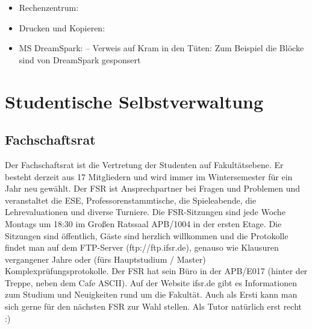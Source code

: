 \documentclass[a4paper,12pt]{report}
\begin{document}
\begin{itemize}
\begin{itemize*}
	\end{itemize*}
	\item Rechenzentrum:
	\item Drucken und Kopieren: 
	\item MS DreamSpark: -- Verweis auf Kram in den Tüten: Zum Beispiel die Blöcke sind von DreamSpark gesponsert
\end{itemize}

\section{Studentische Selbstverwaltung}
\subsection{Fachschaftsrat}
Der Fachschaftsrat ist die Vertretung der Studenten auf Fakultätsebene.
Er besteht derzeit aus 17 Mitgliedern und wird immer im Wintersemester für ein Jahr neu gewählt.
Der FSR ist Ansprechpartner bei Fragen und Problemen und veranstaltet die ESE, Professorenstammtische, die Spieleabende, die Lehrevaluationen und diverse Turniere.
Die FSR-Sitzungen sind jede Woche Montags um 18:30 im Großen Ratssaal APB/1004 in der ersten Etage.
Die Sitzungen sind öffentlich, Gäste sind herzlich willkommen und die Protokolle findet man auf dem FTP-Server (ftp://ftp.ifsr.de), genauso wie Klausuren vergangener Jahre oder (fürs Hauptstudium / Master) Komplexprüfungsprotokolle.
Der FSR hat sein Büro in der APB/E017 (hinter der Treppe, neben dem Cafe ASCII).
Auf der Website ifsr.de gibt es Informationen zum Studium und Neuigkeiten rund um die Fakultät.
Auch als Ersti kann man sich gerne für den nächsten FSR zur Wahl stellen. Als Tutor natürlich erst recht :)
\end{document}
